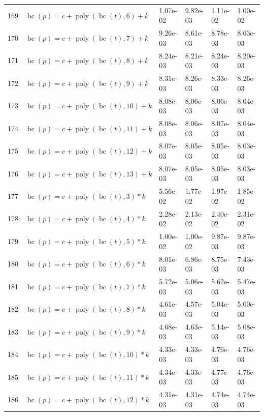 \documentclass[12pt,a4paper]{article}
\DeclareMathOperator{\bc}{bc}
\DeclareMathOperator{\poly}{poly}
\begin{document}
\begin{longtable}[t]{ll>{\raggedleft\arraybackslash}p{2cm}>{\raggedleft\arraybackslash}p{2cm}>{\raggedleft\arraybackslash}p{2cm}>{\raggedleft\arraybackslash}p{2cm}}
\rowcolor{gray!6}  169 & $\bc(p) = c + \poly\left( \bc(t), 6 \right) + k$ & 1.07e-02 & 9.82e-03 & 1.11e-02 & 1.00e-02\\
170 & $\bc(p) = c + \poly\left( \bc(t), 7 \right) + k$ & 9.26e-03 & 8.61e-03 & 8.78e-03 & 8.63e-03\\
\rowcolor{gray!6}  171 & $\bc(p) = c + \poly\left( \bc(t), 8 \right) + k$ & 8.24e-03 & 8.21e-03 & 8.24e-03 & 8.20e-03\\
172 & $\bc(p) = c + \poly\left( \bc(t), 9 \right) + k$ & 8.31e-03 & 8.26e-03 & 8.33e-03 & 8.26e-03\\
\rowcolor{gray!6}  173 & $\bc(p) = c + \poly\left( \bc(t), 10 \right) + k$ & 8.08e-03 & 8.06e-03 & 8.06e-03 & 8.04e-03\\
174 & $\bc(p) = c + \poly\left( \bc(t), 11 \right) + k$ & 8.08e-03 & 8.06e-03 & 8.07e-03 & 8.04e-03\\
\rowcolor{gray!6}  175 & $\bc(p) = c + \poly\left( \bc(t), 12 \right) + k$ & 8.07e-03 & 8.05e-03 & 8.05e-03 & 8.03e-03\\
176 & $\bc(p) = c + \poly\left( \bc(t), 13 \right) + k$ & 8.07e-03 & 8.05e-03 & 8.05e-03 & 8.03e-03\\
\rowcolor{gray!6}  177 & $\bc(p) = c + \poly\left( \bc(t), 3 \right) * k$ & 5.56e-02 & 1.77e-02 & 1.97e-02 & 1.85e-02\\
178 & $\bc(p) = c + \poly\left( \bc(t), 4 \right) * k$ & 2.28e-02 & 2.13e-02 & 2.40e-02 & 2.31e-02\\
\rowcolor{gray!6}  179 & $\bc(p) = c + \poly\left( \bc(t), 5 \right) * k$ & 1.00e-02 & 1.00e-02 & 9.87e-03 & 9.87e-03\\
180 & $\bc(p) = c + \poly\left( \bc(t), 6 \right) * k$ & 8.01e-03 & 6.86e-03 & 8.75e-03 & 7.43e-03\\
\rowcolor{gray!6}  181 & $\bc(p) = c + \poly\left( \bc(t), 7 \right) * k$ & 5.72e-03 & 5.06e-03 & 5.62e-03 & 5.47e-03\\
182 & $\bc(p) = c + \poly\left( \bc(t), 8 \right) * k$ & 4.61e-03 & 4.57e-03 & 5.04e-03 & 5.00e-03\\
\rowcolor{gray!6}  183 & $\bc(p) = c + \poly\left( \bc(t), 9 \right) * k$ & 4.68e-03 & 4.63e-03 & 5.14e-03 & 5.08e-03\\
184 & $\bc(p) = c + \poly\left( \bc(t), 10 \right) * k$ & 4.33e-03 & 4.33e-03 & 4.76e-03 & 4.76e-03\\
\rowcolor{gray!6}  185 & $\bc(p) = c + \poly\left( \bc(t), 11 \right) * k$ & 4.34e-03 & 4.33e-03 & 4.77e-03 & 4.76e-03\\
186 & $\bc(p) = c + \poly\left( \bc(t), 12 \right) * k$ & 4.31e-03 & 4.31e-03 & 4.74e-03 & 4.74e-03\\

\end{longtable}
\end{document}
